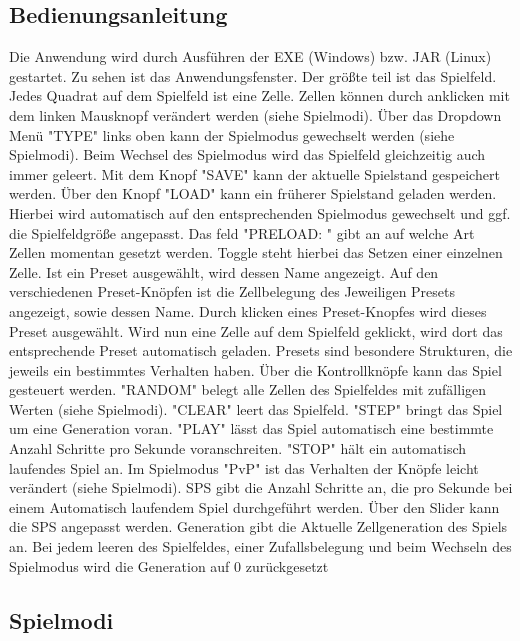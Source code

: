 \documentclass[12pt]{article}
\theoremstyle{plain}
\begin{document}
\subsection{Bedienungsanleitung}

Die Anwendung wird durch Ausführen der EXE (Windows) bzw. JAR (Linux) gestartet. Zu sehen ist das Anwendungsfenster.
Der größte teil ist das Spielfeld. Jedes Quadrat auf dem Spielfeld ist eine Zelle. Zellen können durch anklicken mit dem linken Mausknopf verändert werden (siehe Spielmodi).
Über das Dropdown Menü "TYPE" links oben kann der Spielmodus gewechselt werden (siehe Spielmodi). Beim Wechsel des Spielmodus wird das Spielfeld gleichzeitig auch immer geleert.
Mit dem Knopf "SAVE" kann der aktuelle Spielstand gespeichert werden. Über den Knopf "LOAD" kann ein früherer Spielstand geladen werden. Hierbei wird automatisch auf den entsprechenden Spielmodus gewechselt und ggf. die Spielfeldgröße angepasst.
Das feld "PRELOAD: " gibt an auf welche Art Zellen momentan gesetzt werden. Toggle steht hierbei das Setzen einer einzelnen Zelle. Ist ein Preset ausgewählt, wird dessen Name angezeigt.
Auf den verschiedenen Preset-Knöpfen ist die Zellbelegung des Jeweiligen Presets angezeigt, sowie dessen Name. Durch klicken eines Preset-Knopfes wird dieses Preset ausgewählt. Wird nun eine Zelle auf dem Spielfeld geklickt, wird dort das entsprechende Preset automatisch geladen. Presets sind besondere Strukturen, die jeweils ein bestimmtes Verhalten haben.
Über die Kontrollknöpfe kann das Spiel gesteuert werden. "RANDOM" belegt alle Zellen des Spielfeldes mit zufälligen Werten (siehe Spielmodi).
"CLEAR" leert das Spielfeld. "STEP" bringt das Spiel um eine Generation voran. "PLAY" lässt das Spiel automatisch eine bestimmte Anzahl Schritte pro Sekunde voranschreiten. "STOP" hält ein automatisch laufendes Spiel an. Im Spielmodus "PvP" ist das Verhalten der Knöpfe leicht verändert (siehe Spielmodi).
SPS gibt die Anzahl Schritte an, die pro Sekunde bei einem Automatisch laufendem Spiel durchgeführt werden. Über den Slider kann die SPS angepasst werden.
Generation gibt die Aktuelle Zellgeneration des Spiels an. Bei jedem leeren des Spielfeldes, einer Zufallsbelegung und beim Wechseln des Spielmodus wird die Generation auf 0 zurückgesetzt

\subsection{Spielmodi}
\end{document}
